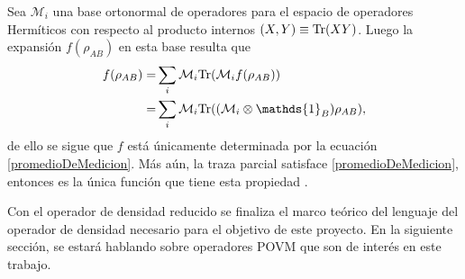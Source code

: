 Sea $\mathcal{M}_i$ una base ortonormal de operadores para el espacio de
operadores Hermíticos con respecto al producto internos $(X,Y) \equiv {\rm Tr}(XY
)$. Luego la expansión $f (\rho_{AB} )$ en esta base resulta que
\[\begin{split}
	f(\rho_{AB})=&\sum_{i}\mathcal{M}_i\tr(\mathcal{M}_i f(\rho_{AB}))\\
	=&\sum_{i}\mathcal{M}_i \tr((\mathcal{M}_i\otimes \mathds{1}_B)\rho_{AB}),\\
\end{split}\] 
de ello se sigue que $f$ está únicamente determinada por la ecuación
{\ref{promedioDeMedicion}}. Más aún, la traza parcial satisface
{\ref{promedioDeMedicion}}, entonces es la única función que tiene esta
propiedad {\cite{nielsen_chuang_2010}}.

Con el operador de densidad reducido se finaliza el marco teórico del lenguaje
del operador de densidad necesario para el objetivo de este proyecto. En la
siguiente sección, se estará hablando sobre operadores POVM que son de interés
en este trabajo.











